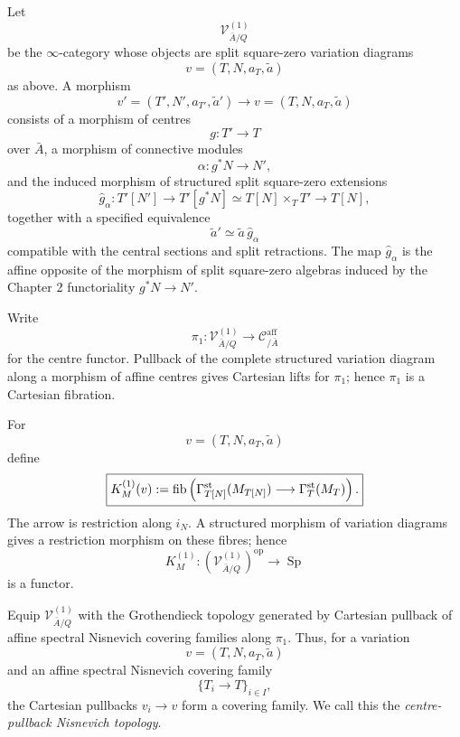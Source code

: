 \begin{definition}
\label{def:var-sqz-category}
Let
\[
    \mathcal V^{(1)}_{\bar A/Q}
\]
be the \(\infty\)-category whose objects are split square-zero variation diagrams
\[
    v=(T,N,a_T,\widetilde a)
\]
as above.  A morphism
\[
    v'=(T',N',a_{T'},\widetilde a')
    \longrightarrow
    v=(T,N,a_T,\widetilde a)
\]
consists of a morphism of centres
\[
    g:T'\longrightarrow T
\]
over \(\bar A\), a morphism of connective modules
\[
    \alpha:g^*N\longrightarrow N',
\]
and the induced morphism of structured split square-zero extensions
\[
    \widehat g_\alpha:
    T'[N']
    \longrightarrow
    T'[g^*N]
    \simeq
    T[N]\times_TT'
    \longrightarrow
    T[N],
\]
together with a specified equivalence
\[
    \widetilde a'
    \simeq
    \widetilde a\,\widehat g_\alpha
\]
compatible with the central sections and split retractions.  The map
\(\widehat g_\alpha\) is the affine opposite of the morphism of split square-zero algebras induced by the Chapter 2 functoriality
\(g^*N\to N'\).

Write
\[
    \pi_1:\mathcal V^{(1)}_{\bar A/Q}
    \longrightarrow
    \mathcal C^{\mathrm{aff}}_{/\bar A}
\]
for the centre functor.  Pullback of the complete structured variation diagram along a morphism of affine centres gives Cartesian lifts for \(\pi_1\); hence \(\pi_1\) is a Cartesian fibration.
\end{definition}

\begin{definition}
\label{def:var-first-difference-functor}
For
\[
    v=(T,N,a_T,\widetilde a)
\]
define
\[
    \boxed{
    K_M^{(1)}(v)
    :=
    \operatorname{fib}\left(
      \Gamma_{T[N]}^{\mathrm{st}}(M_{T[N]})
      \longrightarrow
      \Gamma_T^{\mathrm{st}}(M_T)
    \right).
    }
\]
The arrow is restriction along \(i_N\). A structured morphism of variation diagrams gives a restriction morphism on these fibres; hence
\[
    K_M^{(1)}:
    (\mathcal V^{(1)}_{\bar A/Q})^{\mathrm{op}}
    \longrightarrow
    \operatorname{Sp}
\]
is a functor.
\end{definition}

\begin{definition}
\label{def:var-first-variation-topology}
Equip \(\mathcal V^{(1)}_{\bar A/Q}\) with the Grothendieck topology generated by Cartesian pullback of affine spectral Nisnevich covering families along
\(\pi_1\). Thus, for a variation
\[
    v=(T,N,a_T,\widetilde a)
\]
and an affine spectral Nisnevich covering family
\[
    \{T_i\longrightarrow T\}_{i\in I},
\]
the Cartesian pullbacks \(v_i\to v\) form a covering family. We call this the \emph{centre-pullback Nisnevich topology}.
\end{definition}

